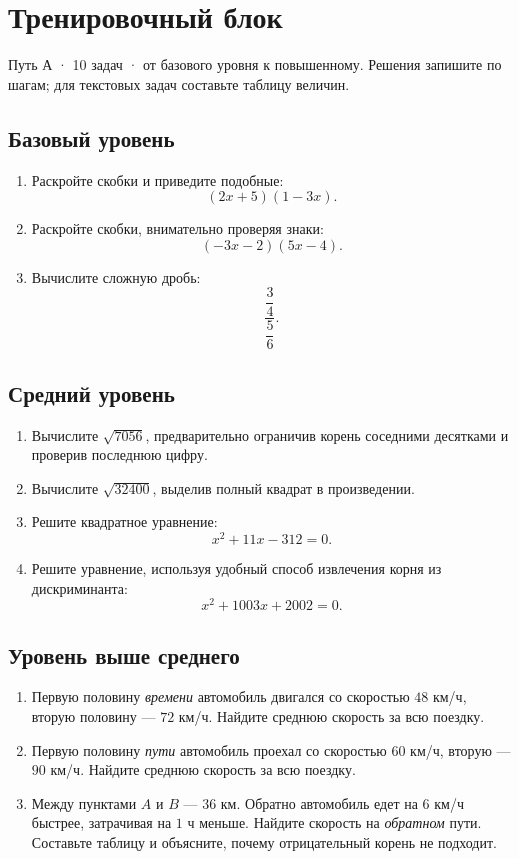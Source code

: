 \documentclass[a4paper,12pt]{article}
\begin{document}
\clearpage
\section*{Тренировочный блок}
\begingroup
{}
\setlength{\abovedisplayskip}{5pt}
\setlength{\belowdisplayskip}{5pt}
\textcolor{softgray}{Путь А · 10 задач · от базового уровня к повышенному. Решения запишите по шагам; для текстовых задач составьте таблицу величин.}

\subsection*{Базовый уровень}
\begin{enumerate}[label=\arabic*.,leftmargin=1.8em,itemsep=4pt]
\item Раскройте скобки и приведите подобные:
\[
(2x+5)(1-3x).
\]
\item Раскройте скобки, внимательно проверяя знаки:
\[
(-3x-2)(5x-4).
\]
\item Вычислите сложную дробь:
\[
\frac{\dfrac34}{\dfrac56}.
\]
\end{enumerate}

\subsection*{Средний уровень}
\begin{enumerate}[label=\arabic*.,leftmargin=1.8em,start=4,itemsep=4pt]
\item Вычислите $\sqrt{7056}$, предварительно ограничив корень соседними десятками и проверив последнюю цифру.
\item Вычислите $\sqrt{32400}$, выделив полный квадрат в произведении.
\item Решите квадратное уравнение:
\[
x^2+11x-312=0.
\]
\item Решите уравнение, используя удобный способ извлечения корня из дискриминанта:
\[
x^2+1003x+2002=0.
\]
\end{enumerate}

\subsection*{Уровень выше среднего}
\begin{enumerate}[label=\arabic*.,leftmargin=1.8em,start=8,itemsep=6pt]
\item Первую половину \emph{времени} автомобиль двигался со скоростью $48$ км/ч, вторую половину --- $72$ км/ч. Найдите среднюю скорость за всю поездку.
\item Первую половину \emph{пути} автомобиль проехал со скоростью $60$ км/ч, вторую --- $90$ км/ч. Найдите среднюю скорость за всю поездку.
\item Между пунктами $A$ и $B$ --- $36$ км. Обратно автомобиль едет на $6$ км/ч быстрее, затрачивая на $1$ ч меньше. Найдите скорость на \emph{обратном} пути. Составьте таблицу и объясните, почему отрицательный корень не подходит.
\end{enumerate}
\endgroup
\end{document}
